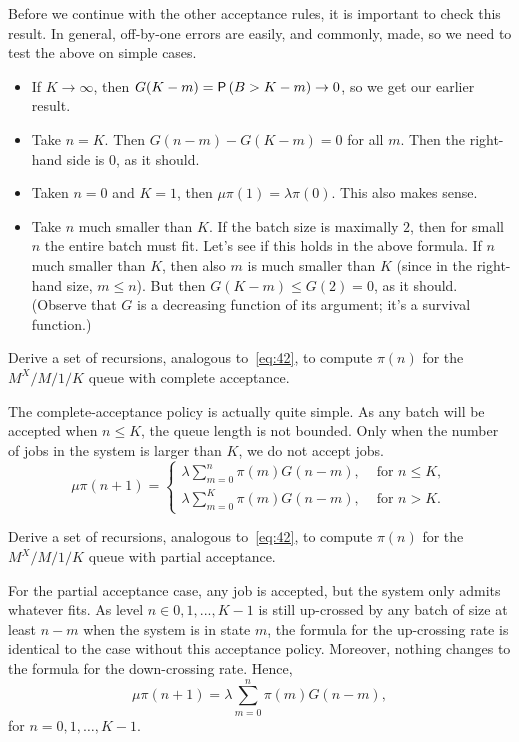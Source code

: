 \begin{exercise}
\begin{solution}
 Before we continue with the other acceptance rules, it is important
 to check this result. In general, off-by-one errors are easily, and
 commonly, made, so we need to test the above on simple cases. 
 \begin{itemize}
 \item If $K\to \infty$, then $G(K-m)=\P{B>K-m}\to 0$, so we get our earlier result. 
 \item Take $n=K$. Then $G(n-m)-G(K-m)=0$ for all $m$. Then the right-hand side is 0, as it should.
 \item Taken $n=0$ and $K=1$, then $\mu \pi(1)= \lambda \pi(0)$. This also makes sense. 
 \item Take $n$ much smaller than $K$. If the batch size is maximally
 $2$, then for small $n$ the entire batch must fit. Let's see if
 this holds in the above formula. If $n$ much smaller than $K$,
 then also $m$ is much smaller than $K$ (since in the right-hand
 size, $m\leq n$). But then $G(K-m) \leq G(2) = 0$, as it
 should. (Observe that $G$ is a decreasing function of its argument;
 it's a survival function.)
 \end{itemize}
\end{solution}
\end{exercise}


\begin{extra}
 Derive a set of recursions, analogous to~\cref{eq:42}, to compute $\pi(n)$ for the $M^X/M/1/K$ queue with complete acceptance.
\begin{solution}
 The complete-acceptance policy is actually quite simple. As any
 batch will be accepted when $n\leq K$, the queue length is not
 bounded. Only when the number of jobs in the system is larger than
 $K$, we do not accept jobs. 
 \begin{equation*}
 \mu \pi(n+1) = 
 \begin{cases}
 \lambda \sum_{m=0}^n \pi(m) G(n-m), & \text{ for } n\leq K,\\
 \lambda \sum_{m=0}^K \pi(m) G(n-m), & \text{ for } n> K.
 \end{cases}
 \end{equation*}
\end{solution}
\end{extra}

\begin{extra}
 Derive a set of recursions, analogous to~\cref{eq:42}, to compute $\pi(n)$ for the $M^X/M/1/K$ queue with partial acceptance.
\begin{solution}
 For the partial acceptance case, any job is accepted, but the system only admits whatever fits.
 As level $n\in {0,1,...,K-1}$ is still up-crossed by any batch of size at least $n-m$ when the system is in state $m$, the formula for the up-crossing rate is identical to the case without this acceptance policy.
 Moreover, nothing changes to the formula for the down-crossing rate.
 Hence,
 \begin{equation*}
 \mu \pi(n+1) = \lambda \sum_{m=0}^n \pi(m) G(n-m), 
 \end{equation*}
 for $n=0,1,\ldots, K-1$. 
\end{solution}
\end{extra}


